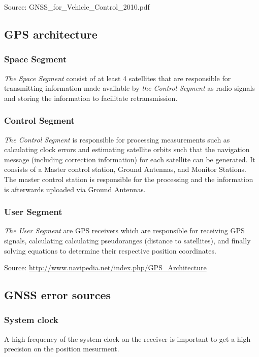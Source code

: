 \documentclass[a4paper,10pt,fleqn]{article}
\begin{document}
Source: GNSS\_for\_Vehicle\_Control\_2010.pdf

\subsection{GPS architecture}
\subsubsection{Space Segment}
\textit{The Space Segment} consist of at least 4 satellites that are responsible for transmitting information made available by \textit{the Control Segment} as radio signals and storing the information to facilitate retransmission. 

\subsubsection{Control Segment}
\textit{The Control Segment} is responsible for processing measurements such as calculating clock errors and estimating satellite orbits such that the navigation message (including correction information) for each satellite can be generated. It consists of a Master control station, Ground Antennas, and Monitor Stations. The master control station is responsible for the processing and the information is afterwards uploaded via Ground Antennas.

\subsubsection{User Segment}
\textit{The User Segment} are GPS receivers which are responsible for receiving GPS signals, calculating calculating pseudoranges (distance to satellites), and finally solving equations to determine their respective position coordinates.

Source: \url{http://www.navipedia.net/index.php/GPS_Architecture}


\subsection{GNSS error sources}

\subsubsection{System clock}

A high frequency of the system clock on the receiver is important to get a high precision on the position mesurment.
\end{document}
